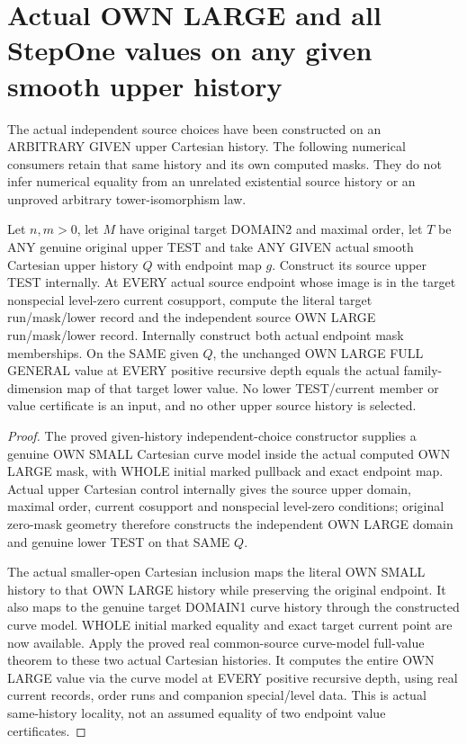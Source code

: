 \section{Actual OWN LARGE and all StepOne values on any given smooth upper history}

The actual independent source choices have been constructed on an
ARBITRARY GIVEN upper Cartesian history. The following numerical consumers
retain that same history and its own computed masks. They do not infer
numerical equality from an unrelated existential source history or an
unproved arbitrary tower-isomorphism law.

\begin{theorem}
\label{hir:original-given-upper-cartesian-own-large-full-values}
\leanok
Let $n,m>0$, let $M$ have original target DOMAIN2 and maximal order, let $T$
be ANY genuine original upper TEST and take ANY GIVEN actual smooth
Cartesian upper history $Q$ with endpoint map $g$. Construct its source
upper TEST internally. At EVERY actual source endpoint whose image is in
the target nonspecial level-zero current cosupport, compute the literal
target run/mask/lower record and the independent source OWN LARGE
run/mask/lower record. Internally construct both actual endpoint mask
memberships. On the SAME given $Q$, the unchanged OWN LARGE FULL GENERAL
value at EVERY positive recursive depth equals the actual family-dimension
map of that target lower value. No lower TEST/current member or value
certificate is an input, and no other upper source history is selected.
\end{theorem}
\begin{proof}
The proved given-history independent-choice constructor supplies a genuine
OWN SMALL Cartesian curve model inside the actual computed OWN LARGE
mask, with WHOLE initial marked pullback and exact endpoint map. Actual
upper Cartesian control internally gives the source upper domain, maximal
order, current cosupport and nonspecial level-zero conditions; original
zero-mask geometry therefore constructs the independent OWN LARGE domain
and genuine lower TEST on that SAME $Q$.

The actual smaller-open Cartesian inclusion maps the literal OWN SMALL
history to that OWN LARGE history while preserving the original endpoint.
It also maps to the genuine target DOMAIN1 curve history through the
constructed curve model. WHOLE initial marked equality and exact target
current point are now available. Apply the proved real common-source
curve-model full-value theorem to these two actual Cartesian histories.
It computes the entire OWN LARGE value via the curve model at EVERY
positive recursive depth, using real current records, order runs and
companion special/level data. This is actual same-history locality, not an
assumed equality of two endpoint value certificates.
\end{proof}


